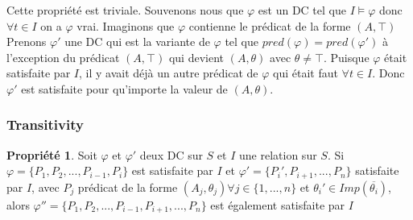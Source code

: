 \documentclass[letterpaper, 12pt]{report}
\theoremstyle{definition}
\newtheorem{myprop}{Propriété}
\begin{document}
Cette propriété est triviale. Souvenons nous que $\varphi$ est un DC tel que $I \models \varphi$ donc $\forall t \in I$ on a $\varphi$ vrai. Imaginons que $\varphi$ contienne le prédicat de la forme $(A,\top)$ Prenons $\varphi'$ une DC qui est la variante de $\varphi$ tel que $pred(\varphi) =  pred(\varphi')$ à l'exception du prédicat $(A,\top)$ qui devient $(A,\theta)$ avec $ \theta \neq \top$. Puisque $\varphi$ était satisfaite par $I$, il y avait déjà un autre prédicat de $\varphi$ qui était faut $\forall t \in I$. Donc $\varphi'$ est satisfaite pour qu'importe la valeur de $(A,\theta)$.

\subsubsection{Transitivity}
%
%
%
%
%	
%	
%	

\begin{myprop}
	Soit $\varphi$ et $\varphi'$ deux DC sur $S$ et $I$ une relation sur $S$. Si $\varphi = \{P_1,P_2,...,P_{i-1},P_i\}$ est satisfaite par $I$ et $\varphi ' = \{P_i',P_{i+1},...,P_n \}$ satisfaite par $I$, avec $P_j$ prédicat de la forme $(A_j,\theta_j) \forall j \in \{1,...,n \}$ et $\theta_i' \in Imp(\overline{\theta_i})$, alors $\varphi'' = \{P_1,P_2,...,P_{i-1},P_{i+1},...,P_n\}$ est également satisfaite par $I$
\end{myprop}
\end{document}
